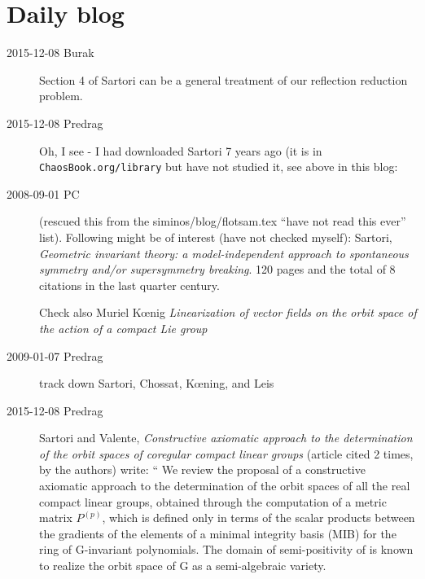 
\chapter{Daily blog}
\label{c-dailyBlog}



\begin{description}

\item[2015-12-08 Burak]
Section 4 of Sartori can be a general treatment
of our reflection reduction problem.

\item[2015-12-08 Predrag] Oh, I see - I had downloaded
Sartori 7 years ago (it is in
\texttt{ChaosBook.org/library} but have not studied it, see above in this
blog:

\item[2008-09-01 PC] (rescued this from the siminos/blog/flotsam.tex
``have not read this ever'' list).
Following might be of interest (have not checked myself):
Sartori,
{\em Geometric invariant theory: a model-independent approach
       to spontaneous symmetry and/or supersymmetry breaking}.
120 pages and the total of 8 citations in the last quarter century.

Check also Muriel K{\oe}nig \emph{Linearization of vector fields on
the orbit space of the action of a compact Lie group}

\item[2009-01-07 Predrag] track down
Sartori,
Chossat,
K{\oe}ning, and
Leis

\item[2015-12-08 Predrag]
Sartori and Valente, {\em Constructive axiomatic approach
to the determination of the orbit spaces of coregular compact linear
groups} (article cited 2 times, by the authors) write: ``
We review the proposal of a constructive axiomatic approach to the
determination of the orbit spaces of all the real compact linear groups,
obtained through the computation of a metric matrix $P^{(p)}$, which is
defined only in terms of the scalar products between the gradients
 of the elements of a minimal integrity basis (MIB) for
the ring of G-invariant polynomials. The domain of semi-positivity
of is known to realize the orbit space of G as a
semi-algebraic variety.


\end{description}
